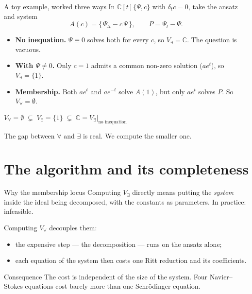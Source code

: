 \documentclass[10pt,aspectratio=169]{beamer}
\newcommand{\C}{\mathbb{C}}
\begin{document}
\begin{frame}{A toy example, worked three ways}
In $\C[t]\{\Psi,c\}$ with $\delta_{t}c = 0$, take the ansatz and system
\[
  A(c) = \{\,\Psi_{tt} - c\,\Psi\,\}, \qquad P = \Psi_{t} - \Psi .
\]

\pause
\begin{itemize}
  \item \textbf{No inequation.} $\Psi\equiv 0$ solves both for every $c$, so
        $V_{\exists} = \C$. The question is vacuous.
  \item \textbf{With $\Psi \neq 0$.} Only $c=1$ admits a common non-zero solution
        ($ae^{t}$), so $V_{\exists} = \{1\}$.
  \item \textbf{Membership.} Both $ae^{t}$ and $ae^{-t}$ solve $A(1)$, but only
        $ae^{t}$ solves $P$. So $V_{\forall} = \emptyset$.
\end{itemize}

\pause
\bigskip
\begin{alertblock}{}
$V_{\forall} = \emptyset \;\subsetneq\; V_{\exists} = \{1\} \;\subsetneq\;
\C = V_{\exists}\big|_{\text{no inequation}}$

\medskip
The gap between $\forall$ and $\exists$ is real. We compute the smaller one.
\end{alertblock}
\end{frame}


\section{The algorithm and its completeness}

\begin{frame}{Why the membership locus}
Computing $V_{\exists}$ directly means putting the \emph{system} inside the ideal
being decomposed, with the constants as parameters. In practice: infeasible.

\pause
\bigskip
Computing $V_{\forall}$ decouples them:

\begin{itemize}
  \item the expensive step --- the decomposition --- runs on the \alert{ansatz
        alone};
  \item each equation of the system then costs one Ritt reduction and its
        coefficients.
\end{itemize}

\pause
\bigskip
\begin{alertblock}{Consequence}
The cost is \alert{independent of the size of the system}. Four Navier--Stokes
equations cost barely more than one Schr\"odinger equation.
\end{alertblock}
\end{frame}
\end{document}

